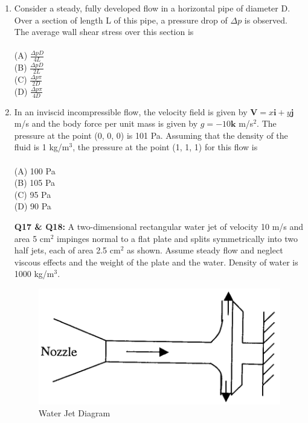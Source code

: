 \documentclass[journal,12pt,onecolumn]{IEEEtran}
\begin{document}
\begin{enumerate}
\item Consider a steady, fully developed flow in a horizontal pipe of diameter D. Over a section of length L of this pipe, a pressure drop of $\Delta p$ is observed. The average wall shear stress over this section is\\
\vspace{0.2cm}
\hfill{} \\
(A) $\frac{\Delta p D}{4L}$\\
(B) $\frac{\Delta p D}{2L}$\\
(C) $\frac{\Delta p \pi}{2D}$\\
(D) $\frac{\Delta p \pi}{4D}$
\vspace{0.5cm}

\item In an inviscid incompressible flow, the velocity field is given by $\mathbf{V} = x \mathbf{i} + y \mathbf{j}$ m/s and the body force per unit mass is given by $g = -10 \mathbf{k}$ m/s$^2$. The pressure at the point (0, 0, 0) is 101 Pa. Assuming that the density of the fluid is 1 kg/m$^3$, the pressure at the point (1, 1, 1) for this flow is\\
\vspace{0.2cm}
\hfill{} \\
(A) 100 Pa\\
(B) 105 Pa\\
(C) 95 Pa\\
(D) 90 Pa
\vspace{0.5cm}


\item[\textbf{Q17 \& Q18:}]
A two-dimensional rectangular water jet of velocity 10 m/s and area 5 cm$^2$ impinges normal to a flat plate and splits symmetrically into two half jets, each of area 2.5 cm$^2$ as shown. Assume steady flow and neglect viscous effects and the weight of the plate and the water. Density of water is 1000 kg/m$^3$.\\

\begin{figure}[htbp]
  \centering
  \includegraphics[width=.65\linewidth]{figs/B/fig4.png}
  \caption{Water Jet Diagram}
  \label{B/fig4}
\end{figure}


\end{enumerate}
\end{document}
